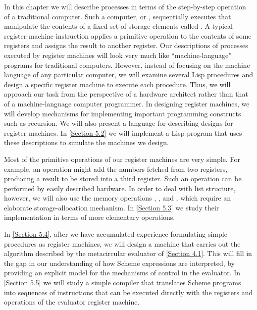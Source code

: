 In this chapter we will describe processes in terms of the step-by-step operation of a traditional computer.
Such a computer, or , sequentially executes  that manipulate the contents of a fixed set of storage elements called .
A typical register-machine instruction applies a primitive operation to the contents of some registers and assigns the result to another register.
Our descriptions of processes executed by register machines will look very much like “machine-language” programs for traditional computers.
However, instead of focusing on the machine language of any particular computer, we will examine several Lisp procedures and design a specific register machine to execute each procedure.
Thus, we will approach our task from the perspective of a hardware architect rather than that of a machine-language computer programmer.
In designing register machines, we will develop mechanisms for implementing important programming constructs such as recursion.
We will also present a language for describing designs for register machines.
In \cref{Section 5.2} we will implement a Lisp program that uses these descriptions to simulate the machines we design.

Most of the primitive operations of our register machines are very simple.
For example, an operation might add the numbers fetched from two registers, producing a result to be stored into a third register.
Such an operation can be performed by easily described hardware.
In order to deal with list structure, however, we will also use the memory operations , , and , which require an elaborate storage-allocation mechanism.
In \cref{Section 5.3} we study their implementation in terms of more elementary operations.

In \cref{Section 5.4}, after we have accumulated experience formulating simple procedures as register machines, we will design a machine that carries out the algorithm described by the metacircular evaluator of \cref{Section 4.1}.
This will fill in the gap in our understanding of how Scheme expressions are interpreted, by providing an explicit model for the mechanisms of control in the evaluator.
In \cref{Section 5.5} we will study a simple compiler that translates Scheme programs into sequences of instructions that can be executed directly with the registers and operations of the evaluator register machine.








